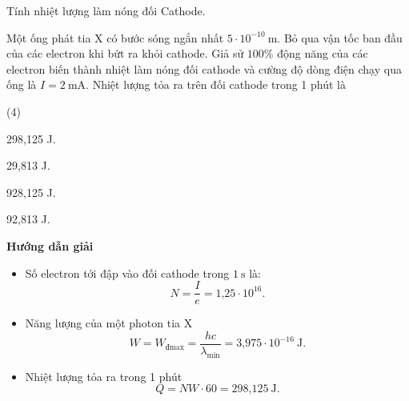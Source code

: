 \begin{dang}{Tính nhiệt lượng làm nóng đối Cathode.}
	
	
	{Một ống phát tia X có bước sóng ngắn nhất $5\cdot 10^{-10}\ \text{m}$. Bỏ qua vận tốc ban đầu của các electron khi bứt ra khỏi cathode. Giả sử $100\%$ động năng của các electron biến thành nhiệt làm nóng đối cathode và cường độ dòng điện chạy qua ống là $I = 2\ \text{mA}$. Nhiệt lượng tỏa ra trên đối cathode trong 1 phút là 
		\begin{mcq}(4)
			\item 298,125 J.
			\item 29,813 J.
			\item 928,125 J.
			\item 92,813 J.
		\end{mcq}
	}
	{\begin{center}
			\textbf{Hướng dẫn giải}
		\end{center}
		
		\begin{itemize}
			\item Số electron tới đập vào đối cathode trong $1\ \text{s}$ là:
			\begin{equation*}
				N=\dfrac{I}{e} = \text{1,25} \cdot 10^{16}.
			\end{equation*}
			\item Năng lượng của một photon tia X 
			\begin{equation*}
				W=W_{\text{đmax}}=\dfrac{hc}{\lambda_{\text{min}}}=\text{3,975} \cdot 10^{-16}\ \text{J}.
			\end{equation*}
			\item Nhiệt lượng tỏa ra trong 1 phút
			\begin{equation*}
				Q=NW \cdot 60 = \text{298,125}\ \text{J}.
			\end{equation*}
		\end{itemize}
		
}
\end{dang}
